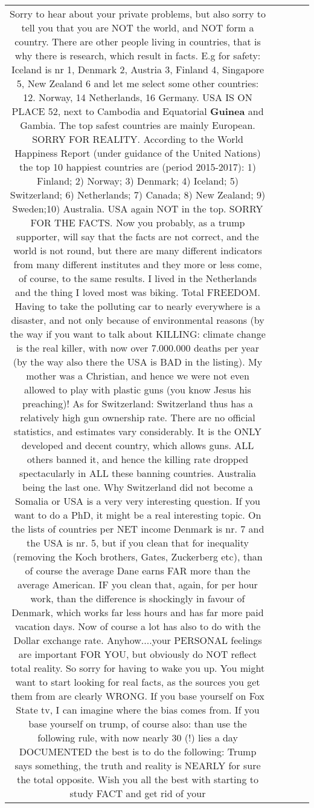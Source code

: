 \documentclass[11pt]{article}
\newlength\mylength
\begin{document}
\begin{center}
\begin{longtable}{|C{.65\mylength}|C{.30\mylength}|C{.12\mylength}|C{.12\mylength}|C{.12\mylength}|}
  \small {} Sorry to hear about your private problems, but also sorry to tell you that you are NOT the world, and NOT form a country. There are other people living in countries, that is why there is research, which result in facts. E.g for safety: Iceland is nr 1, Denmark 2, Austria 3, Finland 4, Singapore 5, New Zealand 6 and let me select some other countries: 12. Norway, 14 Netherlands, 16 Germany. USA IS ON PLACE 52, next to Cambodia and Equatorial \textbf{Guinea} and Gambia. The top safest countries are mainly European. SORRY FOR REALITY. According to the World Happiness Report (under guidance of the United Nations) the top 10 happiest countries are (period 2015-2017): 1) Finland; 2) Norway; 3) Denmark; 4) Iceland; 5) Switzerland; 6) Netherlands; 7) Canada; 8) New Zealand; 9) Sweden;10) Australia. USA again NOT in the top. SORRY FOR THE FACTS. Now you probably, as a trump supporter, will say that the facts are not correct, and the world is not round, but there are many different indicators from many different institutes and they more or less come, of course, to the same results. I lived in the Netherlands and the thing I loved most was biking. Total FREEDOM. Having to take the polluting car to nearly everywhere is a disaster, and not only because of environmental reasons (by the way if you want to talk about KILLING: climate change is the real killer, with now over 7.000.000 deaths per year (by the way also there the USA is BAD in the listing). My mother was a Christian, and hence we were not even allowed to play with plastic guns (you know Jesus his preaching)! As for Switzerland: Switzerland thus has a relatively high gun ownership rate. There are no official statistics, and estimates vary considerably. It is the ONLY developed and decent country, which allows guns. ALL others banned it, and hence the killing rate dropped spectacularly in ALL these banning countries. Australia being the last one. Why Switzerland did not become a Somalia or USA is a very very interesting question. If you want to do a PhD, it might be a real interesting topic. On the lists of countries per NET income Denmark is nr. 7 and the USA is nr. 5, but if you clean that for inequality (removing the Koch brothers, Gates, Zuckerberg etc), than of course the average Dane earns FAR more than the average American. IF you clean that, again, for per hour work, than the difference is shockingly in favour of Denmark, which works far less hours and has far more paid vacation days. Now of course a lot has also to do with the Dollar exchange rate. Anyhow....your PERSONAL feelings are important FOR YOU, but obviously do NOT reflect total reality. So sorry for having to wake you up. You might want to start looking for real facts, as the sources you get them from are clearly WRONG. If you base yourself on Fox State tv, I can imagine where the bias comes from. If you base yourself on trump, of course also: than use the following rule, with now nearly 30 (!) lies a day DOCUMENTED the best is to do the following: Trump says something, the truth and reality is NEARLY for sure the total opposite. Wish you all the best with starting to study FACT and get rid of your 
\end{longtable}
\end{center}
\end{document}
